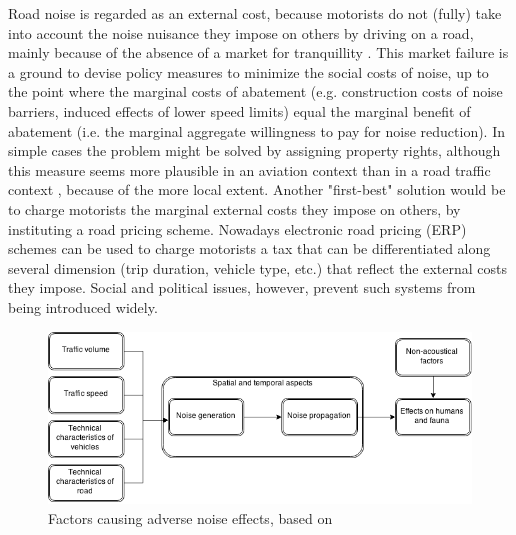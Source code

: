 \documentclass[12pt,a4paper]{scrartcl}
\begin{document}
		Road noise is regarded as an external cost, because motorists do not (fully) take into account the noise nuisance they impose on others by driving on a road, mainly because of the absence of a market for tranquillity \citep{Nelson2008}. This market failure is a ground to devise policy measures to minimize the social costs of noise, up to the point where the marginal costs of abatement (e.g. construction costs of noise barriers, induced effects of lower speed limits) equal the marginal benefit of abatement (i.e. the marginal aggregate willingness to pay for noise reduction). In simple cases the problem might be solved by assigning property rights, although this measure seems more plausible in an aviation context than in a road traffic context \citep{Gillen2003}, because of the more local extent. Another "first-best" solution would be to charge motorists the marginal external costs they impose on others, by instituting a road pricing scheme. Nowadays electronic road pricing (ERP) schemes can be used to charge motorists a tax that can be differentiated along several dimension (trip duration, vehicle type, etc.) that reflect the external costs they impose\citep{Verhoef1995}. Social and political issues, however, prevent such systems from being introduced widely. 
	
		\begin{figure}[h]
			\caption{Factors causing adverse noise effects, based on \cite{Nijland2003}}
			\label{fig:NoiseEffects}
			\centering
			\includegraphics[width=\textwidth]{Graph0}
		\end{figure}
	
\end{document}
